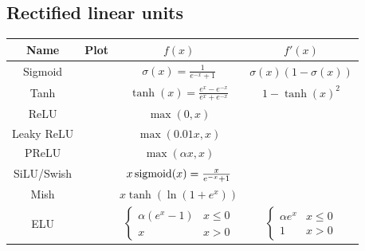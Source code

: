 \subsection{Rectified linear units}



\begin{table}[h]
	\centering
	\small
		\begin{tabular}{c|c|c|c}
			\toprule
			Name            & Plot 	        & $f(x)$   & $f'(x)$    \\
			\midrule
			Sigmoid  		&   		    & $\sigma(x) = \frac{1}{e^{-x} + 1}$ & $\sigma(x)(1-\sigma(x))$\\
            \normalrule
            Tanh            &               & $\tanh(x) = \frac{e^x-e^{-x}}{e^x+e^{-x}}$    & $1 - \tanh(x) ^ 2$\\
            \normalrule
            ReLU            &               & $\max(0, x)   $   & \\
            \normalrule
            Leaky ReLU      &               & $\max(0.01x, x)$  & \\
            \normalrule
            PReLU           &               & $\max(\alpha x, x)$ & \\
            \normalrule
            SiLU/Swish      &               & $x \operatorname{sigmoid}(x) = \frac{x}{e^{-x} + 1}$    & \\
            \normalrule
            Mish            &               & $x\tanh(\ln(1+e^{x}))$ & \\
            \normalrule
            ELU             &               & $\begin{cases}
                \alpha(e^x - 1) & x \leqslant 0\\
                x               & x > 0
            \end{cases}$  &$ \begin{cases}
                \alpha e^x & x \leqslant 0 \\
                1          & x > 0
            \end{cases}$\\

\end{tabular}
\end{table}
